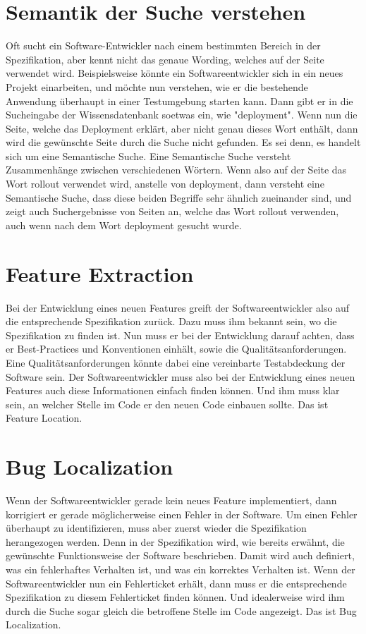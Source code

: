 \section{Semantik der Suche verstehen}
Oft sucht ein Software-Entwickler nach einem bestimmten Bereich in der Spezifikation, aber kennt nicht das genaue Wording, welches auf der Seite verwendet wird.
Beispielsweise könnte ein Softwareentwickler sich in ein neues Projekt einarbeiten, und möchte nun verstehen, wie er die bestehende Anwendung überhaupt in einer Testumgebung starten kann.
Dann gibt er in die Sucheingabe der Wissensdatenbank soetwas ein, wie "deployment".
Wenn nun die Seite, welche das Deployment erklärt, aber nicht genau dieses Wort enthält, dann wird die gewünschte Seite durch die Suche nicht gefunden.
Es sei denn, es handelt sich um eine Semantische Suche.
Eine Semantische Suche versteht Zusammenhänge zwischen verschiedenen Wörtern.
Wenn also auf der Seite das Wort rollout verwendet wird, anstelle von deployment, dann versteht eine Semantische Suche, dass diese beiden Begriffe sehr ähnlich zueinander sind, und zeigt auch Suchergebnisse von Seiten an, welche das Wort rollout verwenden, auch wenn nach dem Wort deployment gesucht wurde.

\section{Feature Extraction}
Bei der Entwicklung eines neuen Features greift der Softwareentwickler also auf die entsprechende Spezifikation zurück.
Dazu muss ihm bekannt sein, wo die Spezifikation zu finden ist.
Nun muss er bei der Entwicklung darauf achten, dass er Best-Practices und Konventionen einhält, sowie die Qualitätsanforderungen.
Eine Qualitätsanforderungen könnte dabei eine vereinbarte Testabdeckung der Software sein.
Der Softwareentwickler muss also bei der Entwicklung eines neuen Features auch diese Informationen einfach finden können.
Und ihm muss klar sein, an welcher Stelle im Code er den neuen Code einbauen sollte.
Das ist Feature Location.

\section{Bug Localization}
Wenn der Softwareentwickler gerade kein neues Feature implementiert, dann korrigiert er gerade möglicherweise einen Fehler in der Software.
Um einen Fehler überhaupt zu identifizieren, muss aber zuerst wieder die Spezifikation herangezogen werden.
Denn in der Spezifikation wird, wie bereits erwähnt, die gewünschte Funktionsweise der Software beschrieben.
Damit wird auch definiert, was ein fehlerhaftes Verhalten ist, und was ein korrektes Verhalten ist.
Wenn der Softwareentwickler nun ein Fehlerticket erhält, dann muss er die entsprechende Spezifikation zu diesem Fehlerticket finden können.
Und idealerweise wird ihm durch die Suche sogar gleich die betroffene Stelle im Code angezeigt.
Das ist Bug Localization.\\

